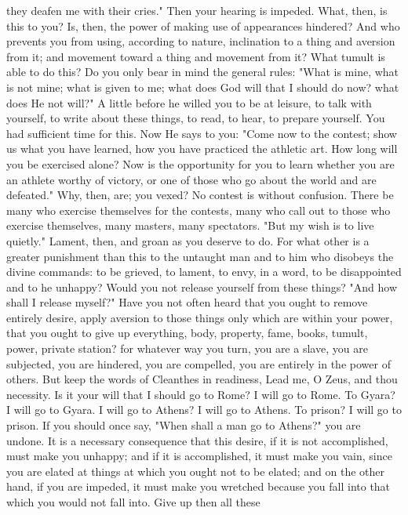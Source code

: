 \documentclass[a4paper]{article}
\begin{document}
they deafen me with their cries." Then your hearing is impeded. What, then, is
this to you? Is, then, the power of making use of appearances hindered? And who
prevents you from using, according to nature, inclination to a thing and
aversion from it; and movement toward a thing and movement from it? What tumult
is able to do this?
    Do you only bear in mind the general rules: "What is mine, what is not
mine; what is given to me; what does God will that I should do now? what does
He not will?" A little before he willed you to be at leisure, to talk with
yourself, to write about these things, to read, to hear, to prepare yourself.
You had sufficient time for this. Now He says to you: "Come now to the contest;
show us what you have learned, how you have practiced the athletic art. How
long will you be exercised alone? Now is the opportunity for you to learn
whether you are an athlete worthy of victory, or one of those who go about the
world and are defeated." Why, then, are; you vexed? No contest is without
confusion. There be many who exercise themselves for the contests, many who
call out to those who exercise themselves, many masters, many spectators. "But
my wish is to live quietly." Lament, then, and groan as you deserve to do. For
what other is a greater punishment than this to the untaught man and to him who
disobeys the divine commands: to be grieved, to lament, to envy, in a word, to
be disappointed and to he unhappy? Would you not release yourself from these
things? "And how shall I release myself?" Have you not often heard that you
ought to remove entirely desire, apply aversion to those things only which are
within your power, that you ought to give up everything, body, property, fame,
books, tumult, power, private station? for whatever way you turn, you are a
slave, you are subjected, you are hindered, you are compelled, you are entirely
in the power of others. But keep the words of Cleanthes in readiness,
       Lead me, O Zeus, and thou necessity.
    Is it your will that I should go to Rome? I will go to Rome. To Gyara? I
will go to Gyara. I will go to Athens? I will go to Athens. To prison? I will
go to prison. If you should once say, "When shall a man go to Athens?" you are
undone. It is a necessary consequence that this desire, if it is not
accomplished, must make you unhappy; and if it is accomplished, it must make
you vain, since you are elated at things at which you ought not to be elated;
and on the other hand, if you are impeded, it must make you wretched because
you fall into that which you would not fall into. Give up then all these
\end{document}
